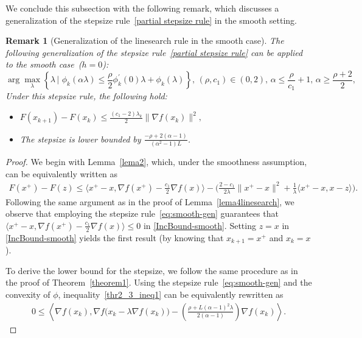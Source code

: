 \documentclass[11pt, a4paper, oneside, reqno]{amsart}
\newtheorem{remark}[theorem]{Remark}
\begin{document}
{\color{black}
We conclude this subsection with the following remark, which discusses a generalization of the stepsize rule~\eqref{partial stepsize rule} in the smooth setting.
\begin{remark}[Generalization of the linesearch rule in the smooth case]\label{smooth-Generalization of the linesearch rule}
The following generalization of the stepsize rule~\eqref{partial stepsize rule} can be applied to the smooth case~($h = 0$):
        \begin{equation} \label{eq:smooth-gen}
          \arg\max\limits_{\lambda} \left \{\lambda \,|\,\,  \phi_k(\alpha\lambda) \leq \dfrac{\rho}{2}\phi_k^{\prime}(0)\lambda + \phi_k(\lambda) \right\}, \, (\rho,c_1) \in (0,2), \, \alpha \leq \frac{\rho}{c_1}+1,\, \alpha \geq \frac{\rho+2}{2},
        \end{equation}
 Under this stepsize rule, the following hold:
 \begin{itemize}
     \item $F(x_{k+1})-F(x_k) \leq \frac{(c_1-2)\lambda_k}{2} \|\nabla f(x_k)\|^2,$
     \item The stepsize is lower bounded by $\frac{-\rho + 2(\alpha - 1)}{(\alpha^2 - 1)L}$.
 \end{itemize}
\end{remark}
\begin{proof}
We begin with Lemma~\ref{lema2}, which, under the smoothness assumption, can be equivalently written as
\begin{align}\label{IncBound-smooth}
    F(x^+) - F(z) \leq \langle x^+ - x,  \nabla f(x^+) - \frac{c_1}{2}\nabla f(x) \rangle - \Big( \frac{2-c_1}{2\lambda} \|x^+ - x\|^2 + \frac{1}{\lambda}\langle x^+ -x, x - z \rangle \Big).
\end{align}
Following the same argument as in the proof of Lemma~\ref{lema4linesearch}, we observe that employing the stepsize rule~\eqref{eq:smooth-gen} guarantees that $\langle x^+ - x,  \nabla f(x^+) - \frac{c_1}{2}\nabla f(x) \rangle \leq 0$ in \eqref{IncBound-smooth}. Setting $z = x$ in \eqref{IncBound-smooth} yields the first result (by knowing that $x_{k+1} = x^+$ and $x_k = x$).

To derive the lower bound for the stepsize, we follow the same procedure as in the proof of Theorem~\ref{theorem1}. Using the stepsize rule~\eqref{eq:smooth-gen} and the convexity of $\phi$, inequality~\eqref{thr2_3_ineq1} can be equivalently rewritten as
\begin{align}\label{thr2_3_ineq1_revised}
    0 \leq \left\langle \nabla f(x_k), \nabla f\bigl(x_k - \lambda \nabla f(x_k)\bigr) - \left(\frac{\rho+L(\alpha-1)^2 \lambda}{2(\alpha - 1)}\right)\nabla f(x_k) \right\rangle.
\end{align}


\end{proof}}
\end{document}

